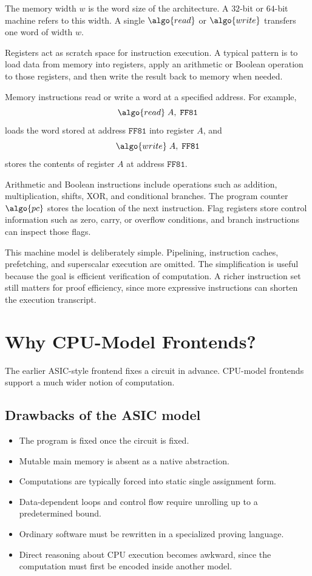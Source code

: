 \documentclass[11pt]{article}
\begin{document}
The memory width $w$ is the word size of the architecture. A $32$-bit or $64$-bit machine refers to this width. A single $\algo{read}$ or $\algo{write}$ transfers one word of width $w$.

Registers act as scratch space for instruction execution. A typical pattern is to load data from memory into registers, apply an arithmetic or Boolean operation to those registers, and then write the result back to memory when needed.

Memory instructions read or write a word at a specified address. For example,
\[
  \algo{read}\; A,\; \texttt{FF81}
\]
loads the word stored at address $\texttt{FF81}$ into register $A$, and
\[
  \algo{write}\; A,\; \texttt{FF81}
\]
stores the contents of register $A$ at address $\texttt{FF81}$.

Arithmetic and Boolean instructions include operations such as addition, multiplication, shifts, XOR, and conditional branches. The program counter $\algo{pc}$ stores the location of the next instruction. Flag registers store control information such as zero, carry, or overflow conditions, and branch instructions can inspect those flags.

This machine model is deliberately simple. Pipelining, instruction caches, prefetching, and superscalar execution are omitted. The simplification is useful because the goal is efficient verification of computation. A richer instruction set still matters for proof efficiency, since more expressive instructions can shorten the execution transcript.

\section{Why CPU-Model Frontends?}

The earlier ASIC-style frontend fixes a circuit in advance. CPU-model frontends support a much wider notion of computation.

\subsection{Drawbacks of the ASIC model}

\begin{itemize}
  \item The program is fixed once the circuit is fixed.
  \item Mutable main memory is absent as a native abstraction.
  \item Computations are typically forced into static single assignment form.
  \item Data-dependent loops and control flow require unrolling up to a predetermined bound.
  \item Ordinary software must be rewritten in a specialized proving language.
  \item Direct reasoning about CPU execution becomes awkward, since the computation must first be encoded inside another model.
\end{itemize}
\end{document}
